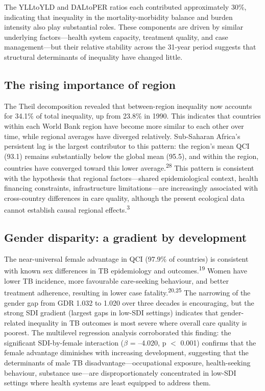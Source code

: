 \documentclass[12pt]{article}
\begin{document}
The YLLtoYLD and DALtoPER ratios each contributed approximately 30\%, indicating that inequality in the mortality-morbidity balance and burden intensity also play substantial roles. These components are driven by similar underlying factors---health system capacity, treatment quality, and case management---but their relative stability across the 31-year period suggests that structural determinants of inequality have changed little.

\subsection{The rising importance of region}

The Theil decomposition revealed that between-region inequality now accounts for 34.1\% of total inequality, up from 23.8\% in 1990. This indicates that countries within each World Bank region have become more similar to each other over time, while regional averages have diverged relatively. Sub-Saharan Africa's persistent lag is the largest contributor to this pattern: the region's mean QCI (93.1) remains substantially below the global mean (95.5), and within the region, countries have converged toward this lower average.\textsuperscript{28} This pattern is consistent with the hypothesis that regional factors---shared epidemiological context, health financing constraints, infrastructure limitations---are increasingly associated with cross-country differences in care quality, although the present ecological data cannot establish causal regional effects.\textsuperscript{3}

\subsection{Gender disparity: a gradient by development}

The near-universal female advantage in QCI (97.9\% of countries) is consistent with known sex differences in TB epidemiology and outcomes.\textsuperscript{19} Women have lower TB incidence, more favourable care-seeking behaviour, and better treatment adherence, resulting in lower case fatality.\textsuperscript{20,25} The narrowing of the gender gap from GDR 1.032 to 1.020 over three decades is encouraging, but the strong SDI gradient (largest gaps in low-SDI settings) indicates that gender-related inequality in TB outcomes is most severe where overall care quality is poorest. The multilevel regression analysis corroborated this finding: the significant SDI-by-female interaction ($\beta$ = --4.020, p $<$ 0.001) confirms that the female advantage diminishes with increasing development, suggesting that the determinants of male TB disadvantage---occupational exposure, health-seeking behaviour, substance use---are disproportionately concentrated in low-SDI settings where health systems are least equipped to address them.
\end{document}
